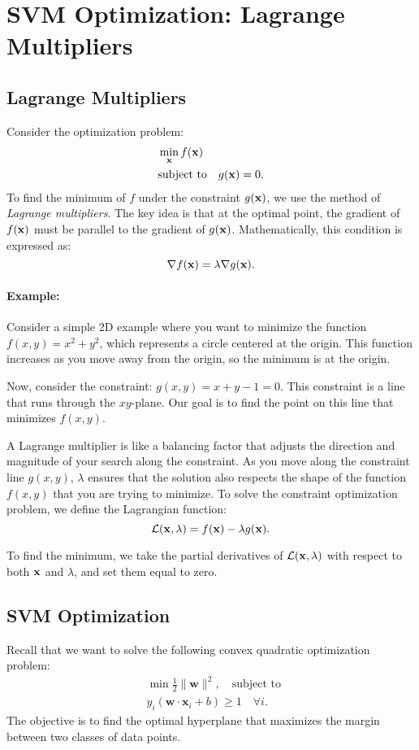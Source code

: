 \section{SVM Optimization: Lagrange Multipliers}
\label{sec:svm_optimization}


\subsection{Lagrange Multipliers}

Consider the optimization problem:
\begin{align*}
&\min_{{\mathbf{x}}} f({\mathbf{x}}) \\
&\text{subject to}\quad g({\mathbf{x}})=0.
\end{align*}
To find the minimum of $f$ under the constraint $g({\mathbf{x}})$, we use the method of \textit{Lagrange multipliers}. The key idea is that at the optimal point, the gradient of $f({\mathbf{x}})$ must be parallel to the gradient of $g({\mathbf{x}})$. Mathematically, this condition is expressed as: 
$$\nabla f({\mathbf{x}}) = \lambda\nabla g({\mathbf{x}}).$$

\paragraph{Example:}
Consider a simple 2D example where you want to minimize the function $f(x,y)=x^2+y^2$, which represents a circle centered at the origin. This function increases as you move away from the origin, so the minimum is at the origin. 

Now, consider the constraint: $g(x,y)=x+y-1=0$. This constraint is a line that runs through the $xy$-plane. Our goal is to find the point on this line that minimizes $f(x,y)$.

A Lagrange multiplier is like a balancing factor that adjusts the direction and magnitude of your search along the constraint. As you move along the constraint line $g(x,y)$, $\lambda$ ensures that the solution also respects the shape of the function $f(x,y)$ that you are trying to minimize. 
To solve the constraint optimization problem, we define the Lagrangian function: 
$$\mathcal{L}({\mathbf{x}}, \lambda) = f({\mathbf{x}}) - \lambda g({\mathbf{x}}).$$

To find the minimum, we take the partial derivatives of $\mathcal{L}({\mathbf{x}}, \lambda)$ with respect to both ${\mathbf{x}}$ and $\lambda$, and set them equal to zero. 

\subsection{SVM Optimization}
Recall that we want to solve the following convex quadratic optimization problem:
\begin{align*}
	&\min \frac{1}{2}\lVert \mathbf{w}\rVert ^2,\quad \textrm{subject to } \\
	&y_i(\mathbf{w}\cdot \mathbf{x}_i+b)\geq 1 \quad\forall i.
\end{align*}
The objective is to find the optimal hyperplane that maximizes the margin between two classes of data points. 

